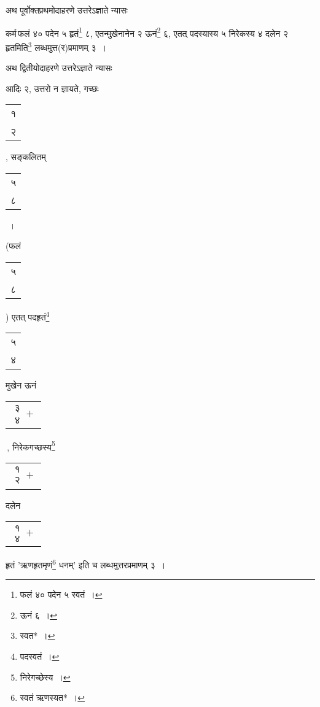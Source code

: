 \documentclass[10pt, openany]{book}
\begin{document}
{{{{{{{अथ पूर्वोक्तप्रथमोदाहरणे उत्तरेऽज्ञाते न्यासः\textendash}
\vspace{1mm}

\hspace{2cm}{आ २, उत्तरो न ज्ञायते, पदं ५, सङ्कलितम् ४०~।}
\vspace{2mm}

{कर्म\textendash \,फलं ४० पदेन ५ हृतं\renewcommand{\thefootnote}{२}\footnote{फलं ४० पदेन ५ स्वतं~।} ८, एतन्मुखेनानेन २ ऊनं\renewcommand{\thefootnote}{३}\footnote{ऊनं ६~।} ६, एतत्
पदस्यास्य ५}
{निरेकस्य ४ दलेन २ हृतमिति\renewcommand{\thefootnote}{४}\footnote{स्वत*~।} लब्धमुत्त(र)प्रमाणम् ३~।}
\vspace{2mm}

{अथ द्वितीयोदाहरणे उत्तरेऽज्ञाते न्यासः\textendash}
\vspace{1mm}

\hspace{20mm} {आदिः २, उत्तरो न ज्ञायते, गच्छः \begin{tabular}{|c|} १\\ २\end{tabular} , सङ्कलितम् \begin{tabular}{|c|} ५\\ ८\end{tabular}~।}
\vspace{2mm}

\hspace{0.01mm} {\bigg(फलं \begin{tabular}{|c|}५\\ ८\end{tabular}\bigg) एतत् पदहृतं\renewcommand{\thefootnote}{५}\footnote{पदस्वतं~।} \begin{tabular}{|c|} ५\\ ४\end{tabular} 
मुखेन ऊनं \begin{tabular}{|c|}$\begin{matrix}
\mbox{{३}}\\
\mbox{{४}}
\end{matrix}+$\end{tabular}\,, निरेकगच्छस्य\renewcommand{\thefootnote}{६}\footnote{निरेगच्छेस्य~।} \begin{tabular}{|c|}$\begin{matrix}
\mbox{{१}}\\
\mbox{{२}}
\end{matrix}+$\end{tabular} दलेन \begin{tabular}{|c|}$\begin{matrix}
\mbox{{१}}\\
\mbox{{४}}
\end{matrix}+$\end{tabular} हृतं {\qt 'ऋणहृतमृणं\renewcommand{\thefootnote}{७}\footnote{स्वतं ऋणस्यत*~।} धनम्'} इति च लब्धमुत्तरप्रमाणम् ३~।}
\vspace{2mm}

}}}}}}
\end{document}
